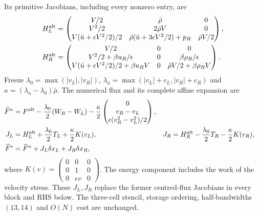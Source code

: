 \documentclass[11pt]{article}
\begin{document}
Its primitive Jacobians, including every nonzero entry, are
\begin{align}
 H^{\rm alt}_L&=
 \begin{pmatrix}
 V/2&\bar\rho&0\\
 V^2/2&2\bar\rho V&0\\
 V(\bar u+\epsilon V^2/2)/2&
 \bar\rho(\bar u+3\epsilon V^2/2)+p_R&\bar\rho V/2
 \end{pmatrix},\\
 H^{\rm alt}_R&=
 \begin{pmatrix}
 V/2&0&0\\
 V^2/2+\beta u_R/\epsilon&0&\beta\rho_R/\epsilon\\
 V(\bar u+\epsilon V^2/2)/2+\beta u_RV&0&
 \bar\rho V/2+\beta\rho_RV
 \end{pmatrix}.
\end{align}
Freeze $\lambda_0=\max(|v_L|,|v_R|)$,
$\lambda_a=\max(|v_L|+c_L,|v_R|+c_R)$ and
$\kappa=(\lambda_a-\lambda_0)\bar\rho$. The numerical flux and its
complete affine expansion are
\begin{align}
 \widehat F^n&=F^{\rm alt}
 -\frac{\lambda_0}{2}(W_R-W_L)
 -\frac{\kappa}{2}
 \begin{pmatrix}0\\v_R-v_L\\\epsilon(v_R^2-v_L^2)/2\end{pmatrix},\\
 J_L&=H^{\rm alt}_L+\frac{\lambda_0}{2}T_L+\frac{\kappa}{2}K(v_L),&
 J_R&=H^{\rm alt}_R-\frac{\lambda_0}{2}T_R-\frac{\kappa}{2}K(v_R),\\
 \widehat F^*&=\widehat F^n+J_L\delta x_L+J_R\delta x_R,
 \label{eq:faceflux}
\end{align}
where $K(v)=\left(\begin{smallmatrix}0&0&0\\0&1&0\\0&\epsilon v&0\end{smallmatrix}\right)$.
The energy component includes the work of the velocity stress.
These $J_L,J_R$ replace the former centred-flux Jacobians in every block
and RHS below. The three-cell stencil, storage ordering, half-bandwidths
$(13,14)$ and $O(N)$ cost are unchanged.
\end{document}
